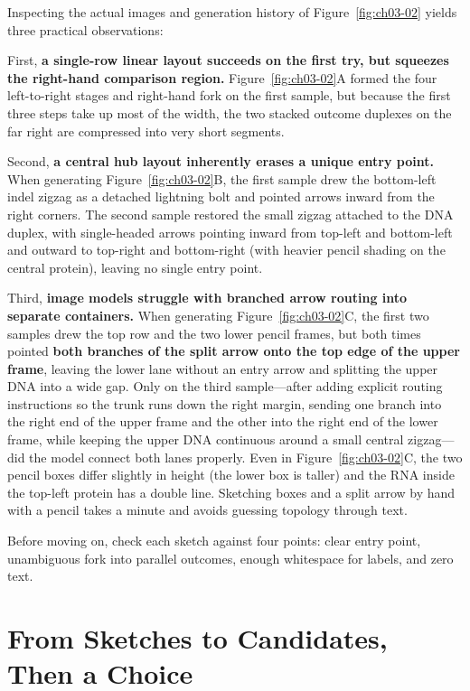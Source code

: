 Inspecting the actual images and generation history of Figure~\ref{fig:ch03-02} yields three practical observations:

First, \textbf{a single-row linear layout succeeds on the first try, but squeezes the right-hand comparison region.} Figure~\ref{fig:ch03-02}A formed the four left-to-right stages and right-hand fork on the first sample, but because the first three steps take up most of the width, the two stacked outcome duplexes on the far right are compressed into very short segments.

Second, \textbf{a central hub layout inherently erases a unique entry point.} When generating Figure~\ref{fig:ch03-02}B, the first sample drew the bottom-left indel zigzag as a detached lightning bolt and pointed arrows inward from the right corners. The second sample restored the small zigzag attached to the DNA duplex, with single-headed arrows pointing inward from top-left and bottom-left and outward to top-right and bottom-right (with heavier pencil shading on the central protein), leaving no single entry point.

Third, \textbf{image models struggle with branched arrow routing into separate containers.} When generating Figure~\ref{fig:ch03-02}C, the first two samples drew the top row and the two lower pencil frames, but both times pointed \textbf{both branches of the split arrow onto the top edge of the upper frame}, leaving the lower lane without an entry arrow and splitting the upper DNA into a wide gap. Only on the third sample—after adding explicit routing instructions so the trunk runs down the right margin, sending one branch into the right end of the upper frame and the other into the right end of the lower frame, while keeping the upper DNA continuous around a small central zigzag—did the model connect both lanes properly. Even in Figure~\ref{fig:ch03-02}C, the two pencil boxes differ slightly in height (the lower box is taller) and the RNA inside the top-left protein has a double line. Sketching boxes and a split arrow by hand with a pencil takes a minute and avoids guessing topology through text.

Before moving on, check each sketch against four points: clear entry point, unambiguous fork into parallel outcomes, enough whitespace for labels, and zero text.

\section{From Sketches to Candidates, Then a Choice}

